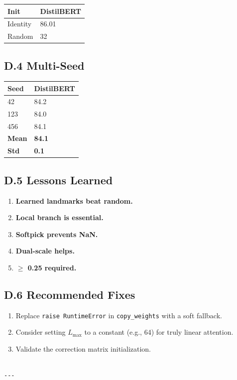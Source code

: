 \begin{table}[H]
\centering
\small
\begin{tabular}{ll}
\toprule
\textbf{Init} & \textbf{DistilBERT} \\
\midrule
Identity & 86.01 \\
Random & 32 \\
\bottomrule
\end{tabular}
\end{table}

\subsection{D.4 Multi-Seed}

\begin{table}[H]
\centering
\small
\begin{tabular}{ll}
\toprule
\textbf{Seed} & \textbf{DistilBERT} \\
\midrule
42 & 84.2 \\
123 & 84.0 \\
456 & 84.1 \\
\textbf{Mean} & \textbf{84.1} \\
\textbf{Std} & \textbf{0.1} \\
\bottomrule
\end{tabular}
\end{table}

\subsection{D.5 Lessons Learned}

\begin{enumerate}
\item \textbf{Learned landmarks beat random.}
\item \textbf{Local branch is essential.}
\item \textbf{Softpick prevents NaN.}
\item \textbf{Dual-scale helps.}
\item \textbf{  $\ge$ 0.25 required.}

\end{enumerate}
\subsection{D.6 Recommended Fixes}

\begin{enumerate}
\item Replace \texttt{raise RuntimeError} in \texttt{copy\_weights} with a soft fallback.
\item Consider setting $L_\text{max}$ to a constant (e.g., 64) for truly
  linear attention.
\item Validate the correction matrix initialization.
\end{enumerate}
\begin{lstlisting}

---
\end{lstlisting}